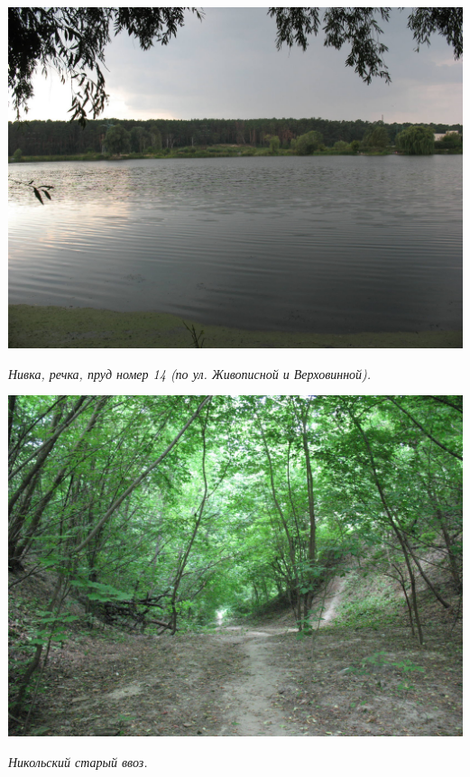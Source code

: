\begin{center}
\includegraphics[width=0.93\linewidth]{rpix/IMG_3997.JPG}

\textit{Нивка, речка, пруд номер 14 (по ул. Живописной и Верховинной).}
\end{center}


\begin{center}
\includegraphics[width=\linewidth]{rpix/IMG_4375.jpg}

\textit{Никольский старый ввоз.}
\end{center}



